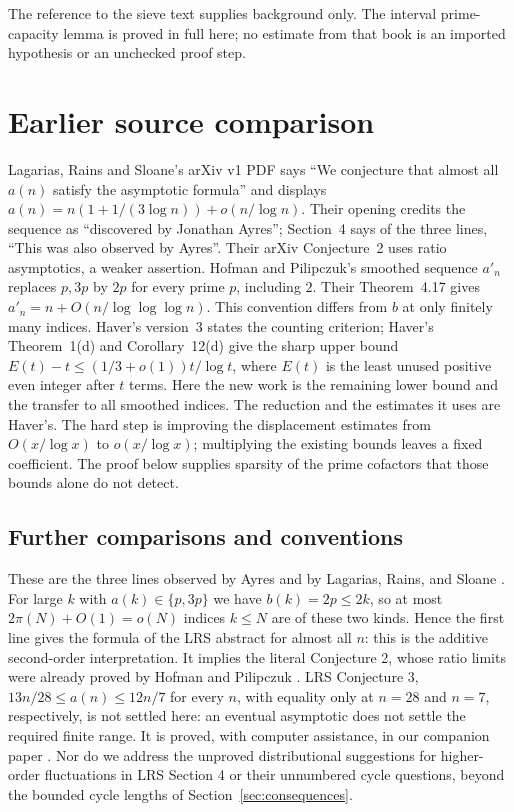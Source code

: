The reference to the sieve text supplies background only. The interval
prime-capacity lemma is proved in full here; no estimate from that book is
an imported hypothesis or an unchecked proof step.

\section{Earlier source comparison}
Lagarias, Rains and Sloane's arXiv v1 PDF \cite[abstract]{lrs} says
``We conjecture that almost all $a(n)$ satisfy the asymptotic formula''
and displays $a(n)=n(1+1/(3\log n))+o(n/\log n)$.
Their opening credits the sequence as ``discovered by Jonathan Ayres'';
Section~4 says of the three lines, ``This was also observed by Ayres''.
Their arXiv Conjecture~2 uses ratio
asymptotics, a weaker assertion. Hofman and Pilipczuk's smoothed sequence $a'_n$ replaces $p,3p$
by $2p$ for every prime $p$, including $2$. Their Theorem~4.17 \cite{hp} gives $a'_n=n+O(n/\log\log\log n)$.
This convention differs from $b$ at only finitely many indices.
Haver's version~3 \cite[Corollary~2(e)]{haver} states the counting
criterion; Haver's Theorem~1(d) and Corollary~12(d) give the sharp upper
bound $E(t)-t\leq(1/3+o(1))t/\log t$, where $E(t)$ is the least
unused positive even integer after $t$ terms. Here the new work is the
remaining lower bound and the transfer to all smoothed indices.
The reduction and the estimates it uses are Haver's.
The hard step is improving the displacement estimates from
$O(x/\log x)$ to $o(x/\log x)$; multiplying the existing bounds
leaves a fixed coefficient. The proof below supplies sparsity of the
prime cofactors that those bounds alone do not detect.


\subsection*{Further comparisons and conventions}
These are the three lines observed by Ayres and by Lagarias, Rains, and
Sloane \cite[Section~4]{lrs}. For large $k$ with $a(k)\in\{p,3p\}$ we have $b(k)=2p\leq2k$, so
at most $2\pi(N)+O(1)=o(N)$ indices $k\leq N$ are of these two kinds.
Hence the first line gives the formula of the LRS abstract for almost
all $n$: this is the additive second-order interpretation. It implies
the literal Conjecture 2, whose ratio limits were already proved
by Hofman and Pilipczuk \cite[Theorem~4.17]{hp}. LRS Conjecture 3,
$13n/28\leq a(n)\leq12n/7$ for every $n$, with equality only at $n=28$
and $n=7$, respectively, is not settled here: an eventual asymptotic
does not settle the required finite range. It is proved, with computer
assistance, in our companion paper \cite[Theorem~1, version~1]{ekgbounds}. Nor do we address the
unproved distributional suggestions for higher-order fluctuations in
LRS Section 4 or their unnumbered cycle questions, beyond the bounded
cycle lengths of Section~\ref{sec:consequences}.

